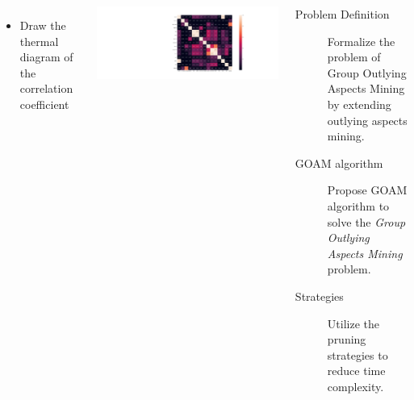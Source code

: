 \documentclass{tikzposter} %
\begin{document}
\begin{columns}
{    \begin{itemize}                            
        \item
        Draw the thermal diagram of the correlation coefficient
    \end{itemize}
    \begin{minipage}{0.4\linewidth}
        \centering
        \includegraphics[width=1\textwidth]{pic1/hot.png} 
    \end{minipage}
}




{
\begin{description}
  \item[Problem Definition]
  Formalize the problem of Group Outlying Aspects Mining by extending outlying aspects mining.

  \item[GOAM algorithm]
  Propose GOAM algorithm to solve the \emph{Group}\\
  \emph{Outlying Aspects Mining} problem.

  \item[Strategies]
  Utilize the pruning strategies to \\ reduce time complexity.
\end{description}
}




\end{columns}
\end{document}
